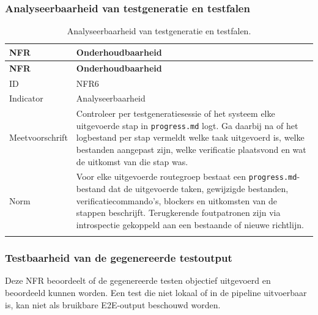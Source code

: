 \subsubsection{Analyseerbaarheid van testgeneratie en testfalen}

\begin{longtable}{p{}p{}}
    \toprule
    \textbf{NFR} & \textbf{Onderhoudbaarheid} \\
    \midrule
    \endfirsthead
    
    \toprule
    \textbf{NFR} & \textbf{Onderhoudbaarheid} \\
    \midrule
    \endhead
    
    ID & NFR6 \\
    \midrule
    Indicator & Analyseerbaarheid \\
    \midrule
    Meetvoorschrift & Controleer per testgeneratiesessie of het systeem elke uitgevoerde stap in \texttt{progress.md} logt. Ga daarbij na of het logbestand per stap vermeldt welke taak uitgevoerd is, welke bestanden aangepast zijn, welke verificatie plaatsvond en wat de uitkomst van die stap was. \\
    \midrule
    Norm & Voor elke uitgevoerde routegroep bestaat een \texttt{progress.md}-bestand dat de uitgevoerde taken, gewijzigde bestanden, verificatiecommando's, blockers en uitkomsten van de stappen beschrijft. Terugkerende foutpatronen zijn via introspectie gekoppeld aan een bestaande of nieuwe richtlijn. \\
    
    \bottomrule
    \caption[NFR6: analyseerbaarheid]{Analyseerbaarheid van testgeneratie en testfalen.}
    \label{tab:nfr-analyseerbaarheid}
\end{longtable}

\subsubsection{Testbaarheid van de gegenereerde testoutput}

Deze NFR beoordeelt of de gegenereerde testen objectief uitgevoerd en beoordeeld kunnen worden. Een test die niet lokaal of in de pipeline uitvoerbaar is, kan niet als bruikbare E2E-output beschouwd worden.

